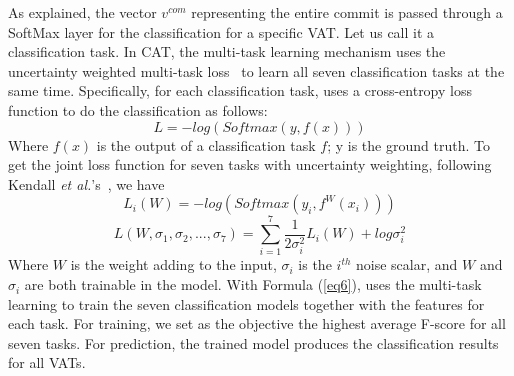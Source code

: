 

As explained, the vector $v^{com}$
representing the entire commit is passed through a SoftMax layer for
the classification for a specific VAT. Let us call it a classification
task. In CAT, the multi-task learning mechanism uses the uncertainty
weighted multi-task loss~\cite{kendall2018multi} to learn all seven
classification tasks at the same time. Specifically, for each
classification task, \tool uses a cross-entropy loss function to do
the classification as follows:
\begin{equation}\label{new-eq4}
	L = -log(Softmax(y, f(x)))
\end{equation}
Where $f(x)$ is the output of a classification task $f$; y is the
ground truth. To get the joint loss function for seven tasks with
uncertainty weighting, following Kendall {\em et
  al.}'s~\cite{kendall2018multi}, we have
\begin{equation}\label{eq5}
	L_i(W) = -log(Softmax(y_i, f^W(x_i)))
\end{equation}
\begin{equation}\label{eq6}
	L(W, \sigma_1, \sigma_2, ..., \sigma_7) = \sum_{i=1}^7\frac{1}{2\sigma_i^2}L_i(W) + log \sigma^2_i
\end{equation}
Where $W$ is the weight adding to the input, $\sigma_i$ is the
$i^{th}$ noise scalar, and $W$ and $\sigma_i$ are both trainable in
the model. With Formula (\ref{eq6}), {\tool} uses the multi-task
learning to train the seven classification models together with the
features for each task. For training, we set as the objective the
highest average F-score  for all seven
tasks. For prediction, the trained model produces the
classification results for all VATs.
